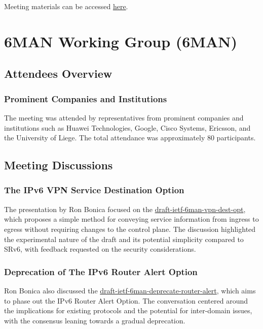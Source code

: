 \documentclass{article}
\begin{document}
Meeting materials can be accessed \href{https://example.com/meeting-materials}{here}.

\newpage

\section{6MAN Working Group (6MAN)}

\subsection{Attendees Overview}
\subsubsection{Prominent Companies and Institutions}
The meeting was attended by representatives from prominent companies and institutions such as Huawei Technologies, Google, Cisco Systems, Ericsson, and the University of Liege. The total attendance was approximately 80 participants.

\subsection{Meeting Discussions}

\subsubsection{The IPv6 VPN Service Destination Option}
The presentation by Ron Bonica focused on the \href{https://datatracker.ietf.org/doc/html/draft-ietf-6man-vpn-dest-opt}{draft-ietf-6man-vpn-dest-opt}, which proposes a simple method for conveying service information from ingress to egress without requiring changes to the control plane. The discussion highlighted the experimental nature of the draft and its potential simplicity compared to SRv6, with feedback requested on the security considerations.

\subsubsection{Deprecation of The IPv6 Router Alert Option}
Ron Bonica also discussed the \href{https://datatracker.ietf.org/doc/html/draft-ietf-6man-deprecate-router-alert}{draft-ietf-6man-deprecate-router-alert}, which aims to phase out the IPv6 Router Alert Option. The conversation centered around the implications for existing protocols and the potential for inter-domain issues, with the consensus leaning towards a gradual deprecation.
\end{document}
